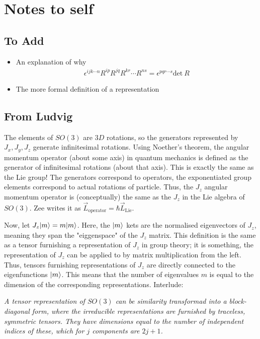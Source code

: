 \section{Notes to self}
\subsection{To Add}
\begin{itemize}
    \item An explanation of why \begin{align*}
        \epsilon^{ijk \cdots n} R^{ip} R^{jq} R^{kr} \cdots R^{ns} = \epsilon^{p q r \cdots s} \mathrm{det}\ R  
    \end{align*}
    \item The more formal definition of a representation
\end{itemize}
\subsection{From Ludvig}
The elements of $SO(3)$ are $3D$ rotations, so the generators represented by $J_x, J_y, J_z$ generate infinitesimal rotations. Using Noether's theorem, the angular momentum operator (about some axis) in quantum mechanics is defined as the generator of infinitesimal rotations (about that axis). This is exactly the same as the Lie group! The generators correspond to operators, the exponentiated group elements correspond to actual rotations of particle. Thus, the $J_z$ angular momentum operator is (conceptually) the same as the $J_z$ in the Lie algebra of $SO(3)$. Zee writes it as $\vec{L}_{\text{operator}} = \hbar \vec{L}_{\text{Lie}}.$

Now, let $J_z \lvert m\rangle = m \lvert m\rangle$. Here, the $\lvert m\rangle$ kets are the normalised eigenvectors of $J_z$, meaning they span the "eiggenspace" of the $J_z$ matrix. This definition is the same as a tensor furnishing a representation of $J_z$ in group theory; it is something, the representation of $J_z$ can be applied to by matrix multiplication from the left. Thus, tensors furnishing representations of $J_z$ are directly connected to the eigenfunctions $\lvert m\rangle$. This means that the number of eigenvalues $m$ is equal to the dimension of the corresponding representations. Interlude:

\textit{A tensor representation of $SO(3)$ can be similarity transformad into a block-diagonal form, where the irreducible representations are furnished by traceless, symmetric tensors. They have dimensions equal to the number of independent indices of these, which for $j$ components are $2j+1$.}

